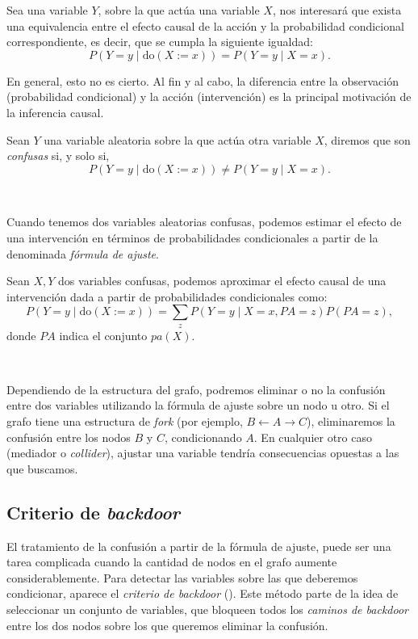 \documentclass[oneside,openright,titlepage,numbers=noenddot,openany,headinclude,footinclude=true,
cleardoublepage=empty,abstractoff,BCOR=5mm,paper=a4,fontsize=12pt,main=spanish]{scrreprt}
\begin{document}
Sea una variable $Y$, sobre la que actúa una variable $X$, nos interesará que exista una equivalencia entre el efecto causal de la acción y la probabilidad condicional correspondiente, es decir, que se cumpla la siguiente igualdad: 
\begin{equation*}
P(Y=y \mid \text{do}(X:=x))=P(Y=y \mid X=x).
\end{equation*}

En general, esto no es cierto. Al fin y al cabo, la diferencia entre la observación (probabilidad condicional) y la acción (intervención) es la principal motivación de la inferencia causal.\\

\begin{definition}[Confusión]
Sean $Y$ una variable aleatoria sobre la que actúa otra variable $X$, diremos que son \textit{confusas} si, y solo si, $$P(Y=y \mid \text{do}(X:=x)) \neq P(Y=y \mid X=x).$$
\end{definition}\

Cuando tenemos dos variables aleatorias confusas, podemos estimar el efecto de una intervención en términos de probabilidades condicionales a partir de la denominada \textit{fórmula de ajuste}.\\

\begin{proposition} \label{prop:forajuste}
Sean $X,Y$ dos variables confusas, podemos aproximar el efecto causal de una intervención dada a partir de probabilidades condicionales como: $$P(Y=y \mid \text{do}(X:=x))=\sum_{z}P(Y=y \mid X=x,PA=z)P(PA=z),$$
donde $PA$ indica el conjunto $pa(X)$.
\end{proposition}\

Dependiendo de la estructura del grafo, podremos eliminar o no la confusión entre dos variables utilizando la fórmula de ajuste sobre un nodo u otro. Si el grafo tiene una estructura de \textit{fork} (por ejemplo, $B \leftarrow A \to C$), eliminaremos la confusión entre los nodos $B$ y $C$, condicionando $A$. En cualquier otro caso (mediador o \textit{collider}), ajustar una variable tendría consecuencias opuestas a las que buscamos.

\subsection*{Criterio de \textit{backdoor}}

El tratamiento de la confusión a partir de la fórmula de ajuste, puede ser una tarea complicada cuando la cantidad de nodos en el grafo aumente considerablemente. Para detectar las variables sobre las que deberemos condicionar, aparece el \textit{criterio de backdoor} (\cite{causality2000}). Este método parte de la idea de seleccionar un conjunto de variables, que bloqueen todos los \textit{caminos de backdoor} entre los dos nodos sobre los que queremos eliminar la confusión.\\
\end{document}
